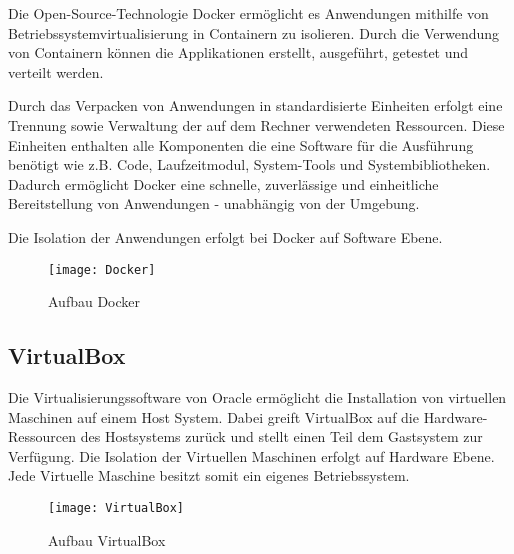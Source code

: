Die Open-Source-Technologie Docker ermöglicht es Anwendungen mithilfe von Betriebssystemvirtualisierung in Containern zu isolieren. Durch die Verwendung von Containern können die Applikationen erstellt, ausgeführt, getestet und verteilt werden. 

Durch das Verpacken von Anwendungen in standardisierte Einheiten erfolgt eine Trennung sowie Verwaltung der auf dem Rechner verwendeten Ressourcen. Diese Einheiten enthalten alle Komponenten die eine Software für die Ausführung benötigt wie z.B. Code, Laufzeitmodul, System-Tools und Systembibliotheken. Dadurch ermöglicht Docker eine schnelle, zuverlässige und einheitliche Bereitstellung von Anwendungen - unabhängig von der Umgebung.

Die Isolation der Anwendungen erfolgt bei Docker auf Software Ebene.

\begin{figure}[!htb]
	\centering
	\texttt{[image: Docker]}
	\caption{Aufbau Docker}
	\label{img:AufbauDocker}
\end{figure}

\subsection{VirtualBox}
\label{subsec:VirtualBox}

Die Virtualisierungssoftware von Oracle ermöglicht die Installation von virtuellen Maschinen auf einem Host System. Dabei greift VirtualBox auf die Hardware-Ressourcen des Hostsystems zurück und stellt einen Teil dem Gastsystem zur Verfügung. Die Isolation der Virtuellen Maschinen erfolgt auf Hardware Ebene. Jede Virtuelle Maschine besitzt somit ein eigenes Betriebssystem.

\begin{figure}[!htb]
	\centering
	\texttt{[image: VirtualBox]}
	\caption{Aufbau VirtualBox}
	\label{img:AufbauVirtualBox}
\end{figure}